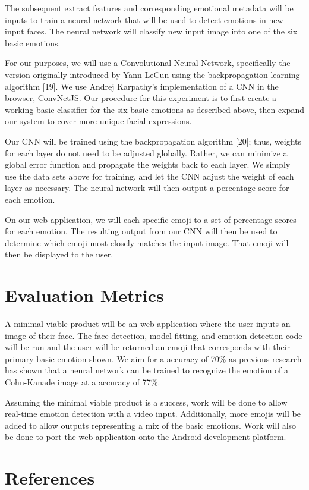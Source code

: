 \documentclass[10pt,twocolumn,letterpaper]{article}
\begin{document}
The subsequent extract features and corresponding emotional metadata will be inputs to train a neural network that will be used to detect emotions in new input faces. The neural network will classify new input image into one of the six basic emotions. 

For our purposes, we will use a Convolutional Neural Network, specifically the version originally introduced by Yann LeCun using the backpropagation learning algorithm [19]. We use Andrej Karpathy's implementation of a CNN in the browser, ConvNetJS. Our procedure for this experiment is to first create a working basic classifier for the six basic emotions as described above, then expand our system to cover more unique facial expressions. 

Our CNN will be trained using the backpropagation algorithm [20]; thus, weights for each layer do not need to be adjusted globally. Rather, we can minimize a global error function and propagate the weights back to each layer. We simply use the data sets above for training, and let the CNN adjust the weight of each layer as necessary. The neural network will then output a percentage score for each emotion.

On our web application, we will each specific emoji to a set of percentage scores for each emotion. The resulting output from our CNN will then be used to determine which emoji most closely matches the input image. That emoji will then be displayed to the user.

\section{Evaluation Metrics}

A minimal viable product will be an web application where the user inputs an image of their face. The face detection, model fitting, and emotion detection code will be run and the user will be returned an emoji that corresponds with their primary basic emotion shown. We aim for a accuracy of 70\% as previous research has shown that a neural network can be trained to recognize the emotion of a Cohn-Kanade image at a accuracy of 77\%.

Assuming the minimal viable product is a success, work will be done to allow real-time emotion detection with a video input. Additionally, more emojis will be added to allow outputs representing a mix of the basic emotions. Work will also be done to port the web application onto the Android development platform.

\section{References}
\end{document}
